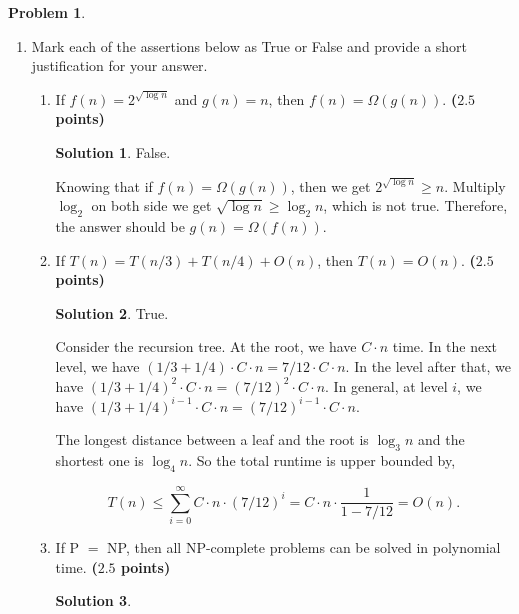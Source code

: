 \documentclass{article}
\theoremstyle{definition}
\newtheorem{problem}{Problem}
\newtheorem*{solution*}{Solution}
\newenvironment{solution}{\begin{solution*}}{{} \end{solution*}}
\newcommand{\grade}[1]{\hfill{\textbf{($\mathbf{#1}$ points)}}}
\begin{document}
\begin{problem}\label{basics} 
~
\begin{enumerate}[label=(\alph*)]
	\item Mark each of the assertions below as True or False and provide a short justification for your answer. 

	
	\vspace{2cm}
	
		\begin{enumerate}[label=(\roman*)]
		\item If $f(n) = 2^{\sqrt{\log{n}}}$ and $g(n) = n$, then $f(n) = \Omega(g(n))$. \grade{2.5}
		
		\medskip
		\begin{solution}
		
		False.
		
		Knowing that if $f(n) = \Omega(g(n))$, then we get $2^{\sqrt{\log{n}}} \geq n$. Multiply $\log_2$ on both side we get $ \sqrt{\log{n}} \geq \log_2n $, which is not true.
		Therefore, the answer should be $g(n) = \Omega(f(n))$.
			
		\end{solution}
		\vfill
		
		\item If $T(n) = T(n/3) + T(n/4) + O(n)$, then $T(n) = O(n)$. \grade{2.5}
			\medskip
		\begin{solution}
		
		True.
		
		Consider  the  recursion  tree.   At  the  root,  we  have $C \cdot n$ time.   In  the  next  level,  we  have $(1/3 + 1/4) \cdot C \cdot n = 7/12 \cdot C \cdot n$. In the level after that, we have $(1/3 + 1/4)^2 \cdot C \cdot n = (7/12)^2 \cdot C \cdot n$. In general, at level $i$, we have $(1/3 + 1/4)^{i-1} \cdot C \cdot n = (7/12)^{i-1} \cdot C \cdot n$. 
		
		The longest distance between a leaf and the root is $\log_3 n$ and the shortest one is $\log_4 n$. So the total runtime is upper bounded by, 
		
		\begin{equation*}
		T(n) \leq \sum_{i=0}^\infty C \cdot n \cdot (7/12)^i = C \cdot n \cdot \frac{1}{1- 7/12} = O(n). 
		\end{equation*}
		
		\end{solution}
		\vfill
		
		\item If P $=$ NP, then all NP-complete problems can be solved in polynomial time. \grade{2.5}
			\medskip
		\begin{solution}
		

\end{solution}
\end{enumerate}
\end{enumerate}
\end{problem}
\end{document}
